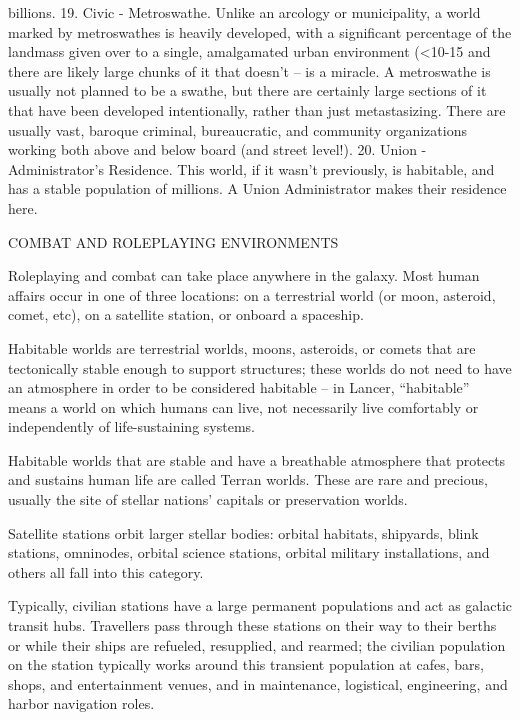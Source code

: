          billions.
     19. Civic - Metroswathe. Unlike an arcology or municipality, a world marked by metroswathes
         is heavily developed, with a significant percentage of the landmass given over to a single,
         amalgamated urban environment (<10-15%
         and there are likely large chunks of it that doesn’t -- is a miracle. A metroswathe is usually
         not planned to be a swathe, but there are certainly large sections of it that have been
         developed intentionally, rather than just metastasizing. There are usually vast, baroque
         criminal, bureaucratic, and community organizations working both above and below board
         (and street level!).
    20. Union - Administrator’s Residence. This world, if it wasn’t previously, is habitable, and has
         a stable population of millions. A Union Administrator makes their residence here.

COMBAT AND ROLEPLAYING ENVIRONMENTS

Roleplaying and combat can take place anywhere in the galaxy. Most human affairs occur in one
of three locations: on a terrestrial world (or moon, asteroid, comet, etc), on a satellite station, or
onboard a spaceship.





Habitable worlds are terrestrial worlds, moons, asteroids, or comets that are tectonically stable
enough to support structures; these worlds do not need to have an atmosphere in order to be
considered habitable -- in Lancer, “habitable” means a world on which humans can live, not
necessarily live comfortably or independently of life-sustaining systems.


Habitable worlds that are stable and have a breathable atmosphere that protects and sustains
human life are called Terran worlds. These are rare and precious, usually the site of stellar
nations’ capitals or preservation worlds.


Satellite stations orbit larger stellar bodies: orbital habitats, shipyards, blink stations, omninodes,
orbital science stations, orbital military installations, and others all fall into this category.


Typically, civilian stations have a large permanent populations and act as galactic transit hubs.
Travellers pass through these stations on their way to their berths or while their ships are
refueled, resupplied, and rearmed; the civilian population on the station typically works around
this transient population at cafes, bars, shops, and entertainment venues, and in maintenance,
logistical, engineering, and harbor navigation roles.


